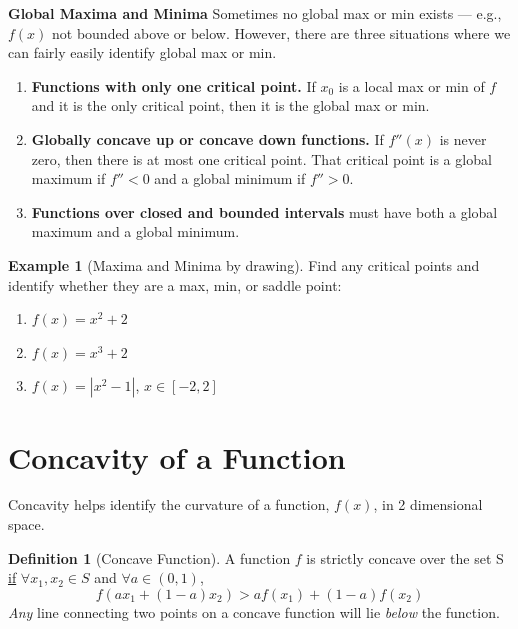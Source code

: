 \documentclass[
]{book}
\providecommand{\tightlist}{%
  \setlength{\itemsep}{0pt}\setlength{\parskip}{0pt}}
\theoremstyle{definition}
\newtheorem{definition}{Definition}[chapter]
\theoremstyle{definition}
\newtheorem{example}{Example}[chapter]
\theoremstyle{definition}
\theoremstyle{definition}
\theoremstyle{remark}
\begin{document}
\textbf{Global Maxima and Minima} Sometimes no global max or min exists --- e.g., \(f(x)\) not bounded above or below. However, there are three situations where we can fairly easily identify global max or min.

\begin{enumerate}
\def\labelenumi{\arabic{enumi}.}
\tightlist
\item
  \textbf{Functions with only one critical point.} If \(x_0\) is a local max or min of \(f\) and it is the only critical point, then it is the global max or min.
\item
  \textbf{Globally concave up or concave down functions.} If \(f''(x)\) is never zero, then there is at most one critical point. That critical point is a global maximum if \(f''<0\) and a global minimum if \(f''>0\).
\item
  \textbf{Functions over closed and bounded intervals} must have both a global maximum and a global minimum.
\end{enumerate}

\begin{example}[Maxima and Minima by drawing]
\protect\hypertarget{exm:unnamed-chunk-233}{}{\label{exm:unnamed-chunk-233} {} }
Find any critical points and identify whether they are a max, min, or saddle point:

\begin{enumerate}
\def\labelenumi{\arabic{enumi}.}
\tightlist
\item
  \(f(x)=x^2+2\)
\item
  \(f(x)=x^3+2\)
\item
  \(f(x)=|x^2-1|\), \(x\in [-2,2]\)
\end{enumerate}
\end{example}

\hypertarget{concavity-of-a-function}{%
\section{Concavity of a Function}\label{concavity-of-a-function}}

Concavity helps identify the curvature of a function, \(f(x)\), in 2 dimensional space.

\begin{definition}[Concave Function]
\protect\hypertarget{def:unnamed-chunk-234}{}{\label{def:unnamed-chunk-234} {} }A function \(f\) is strictly concave over the set S \underline{if} \(\forall x_1,x_2 \in S\) and \(\forall a \in (0,1)\), \[f(ax_1 + (1-a)x_2) > af(x_1) + (1-a)f(x_2)\]
\textit{Any} line connecting two points on a concave function will lie \textit{below} the function.
\end{definition}
\end{document}

